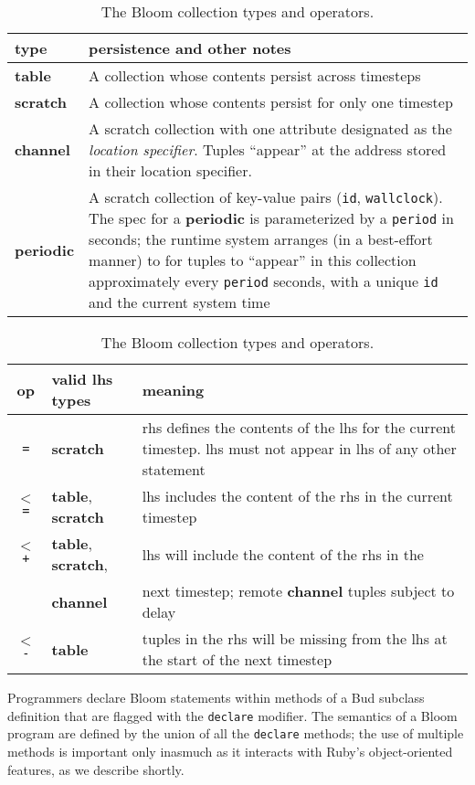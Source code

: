 \begin{table}
	\begin{small}
	\begin{tabular}{|l|p{2.55in}|}
		\hline
		type & persistence and other notes\\
		\hline
		\textbf{table} & A collection whose contents persist across timesteps\\
		\textbf{scratch} & A collection whose contents persist for only one timestep\\
		\textbf{channel} & A scratch collection with one attribute designated as the {\em location specifier}. Tuples ``appear'' at the address stored in their location specifier.\\
		\textbf{periodic} & A scratch collection of key-value pairs (\texttt{id}, \texttt{wallclock}).  The spec for a \textbf{periodic} is parameterized by a \texttt{period} in seconds; the runtime system arranges (in a best-effort manner) to for tuples to ``appear'' in this collection approximately every \texttt{period} seconds, with a unique \texttt{id} and the current system time\\
		\hline
	\end{tabular}

	\vspace{2em}
	
	\begin{tabular}{|c|l|p{2in}|}
		\hline
		op & valid lhs types & meaning\\
				\hline 
		\texttt{=} & \textbf{scratch} & rhs defines the contents of the lhs for the current timestep.  lhs must not appear in lhs of any other statement\\
		\texttt{$<$=} & \textbf{table}, \textbf{scratch} & lhs includes the content of the rhs in the current timestep\\
		\texttt{$<$+} & \textbf{table}, \textbf{scratch}, & lhs will include the content of the rhs in the\\
		              & \textbf{channel} &  next timestep; remote \textbf{channel} tuples subject to delay \\
		\texttt{$<$-} & \textbf{table} & tuples in the rhs will be missing from the lhs at the start of  the next timestep\\
		\hline
	\end{tabular}
	\end{small}
	\caption{The Bloom collection types and operators.}
	\label{tab:bloom}
\end{table}

Programmers declare Bloom statements within methods of a Bud subclass definition that are flagged with the \texttt{declare} modifier.  The semantics of a Bloom program are defined by the union of all the \texttt{declare} methods; the use of multiple methods is important only inasmuch as it interacts with Ruby's object-oriented features, as we describe shortly.

